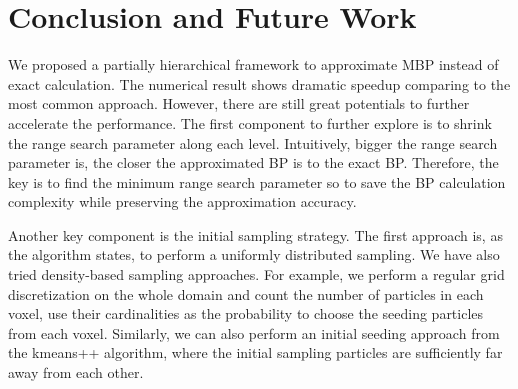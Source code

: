 \section{Conclusion and Future Work}
We proposed a partially hierarchical framework to approximate MBP instead of exact calculation. The numerical result shows dramatic speedup comparing to the most common approach. However, there are still great potentials to further accelerate the performance. The first component to further explore is to shrink the range search parameter along each level. Intuitively, bigger the range search parameter is, the closer the approximated BP is to the exact BP. Therefore, the key is to find the minimum range search parameter so to save the BP calculation complexity while preserving the approximation accuracy. 

Another key component is the initial sampling strategy. The first approach is, as the algorithm states, to perform a uniformly distributed sampling. We have also tried density-based sampling approaches. For example, we perform a regular grid discretization on the whole domain and count the number of particles in each voxel, use their cardinalities as the probability to choose the seeding particles from each voxel. Similarly, we can also perform an initial seeding approach from the kmeans++ algorithm, where the initial sampling particles are sufficiently far away from each other. 


